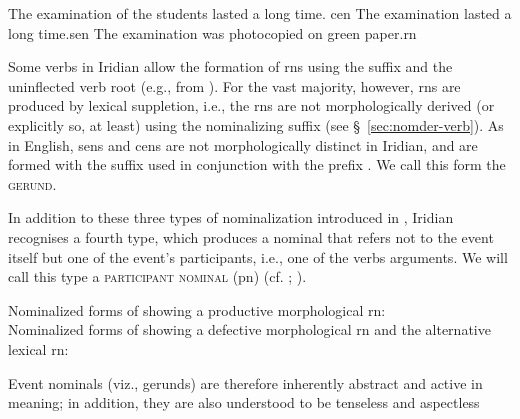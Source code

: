 \pex[interpartskip=0pt]
	\a The examination of the students lasted a long time. \hfill {\sc cen}
	\a The examination lasted a long time.\hfill {\sc sen}
	\a The examination was photocopied on green paper.\hfill {\sc rn}\\
\xe

Some verbs in Iridian allow the formation of {\sc rn}s using the suffix
 and the uninflected verb root (e.g.,  from
). For the vast majority, however, {\sc rn}s are produced
by lexical suppletion, i.e., the {\sc rn}s are not morphologically derived (or
explicitly so, at least) using the nominalizing suffix (see
\S~\ref{sec:nomder-verb}). As in English, {\sc sen}s and {\sc cen}s are not
morphologically distinct in Iridian, and are formed with the suffix 
used in conjunction with the prefix . We call this form the
{\scshape gerund}.

In addition to these three types of nominalization introduced in
\textcite{grimshaw1990}, Iridian recognises a fourth type, which produces a
nominal that refers not to the event itself but one of the event's participants,
i.e., one of the verbs arguments. We will call this type a {\scshape participant
nominal} ({\sc pn}) (cf. \cite[400-5]{schackow2015}; \cite[297-8]{okuna}).

\pex \a Nominalized forms of  showing a productive morphological {\sc rn}:\smallskip\\
\a Nominalized forms of  showing a defective morphological {\sc rn} and the alternative lexical {\sc rn}:\smallskip\\
	\xe


Event nominals (viz., gerunds) are therefore inherently abstract and active in
meaning; in addition, they are also understood to be tenseless and aspectless

